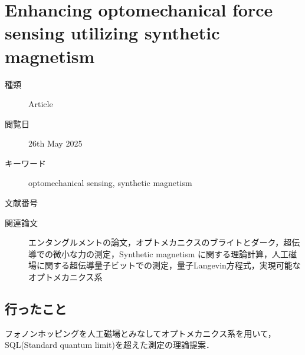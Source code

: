 \documentclass{report}
\begin{document}
  \chapter{Enhancing optomechanical force sensing utilizing synthetic magnetism}
    \begin{boxnote}
      \begin{description}
        \item[種類] Article
        \item[閲覧日] 26th May 2025
        \item[キーワード] optomechanical sensing, synthetic magnetism
        \item[文献番号] \cite{PhysRevA.111.053508}
        \item[関連論文] エンタングルメントの論文\cite{PhysRevLett.129.063602}，オプトメカニクスのブライトとダーク\cite{lake2020two}，超伝導での微小な力の測定\cite{PhysRevLett.128.150501}，Synthetic magnetism に関する理論計算\cite{PhysRevLett.129.063602}，人工磁場に関する超伝導量子ビットでの測定\cite{massel2012multimode}，量子Langevin方程式\cite{PhysRevLett.46.1}，実現可能なオプトメカニクス系\cite{eichenfield2009picogram}
      \end{description}
    \end{boxnote}
    \section{行ったこと}
      フォノンホッピングを人工磁場とみなしてオプトメカニクス系を用いて，SQL(Standard quantum limit)を超えた測定の理論提案．
\end{document}
